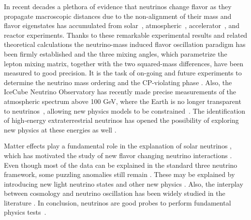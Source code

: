 \documentclass[3p,12pt]{elsarticle}
\begin{document}
In recent decades a plethora of evidence that neutrinos change
flavor as they propagate macroscopic distances due to the
non-alignment of their mass and flavor eigenstates has accumulated from
solar~\citep{Abe:2010hy, Borexino2014},
atmospheric~\citep{PhysRevD.91.072004,Richard:2015aua},
accelerator~\citep{PhysRevLett.112.181801,
  PhysRevD.93.051104,PhysRevLett.116.151806, PhysRevLett.110.251801}, and
reactor \citep{An:2013zwz,Abe:2015rcp, Kim:2016yvm} experiments.
Thanks to these remarkable
experimental results and related theoretical calculations the
  neutrino-mass induced flavor oscillation paradigm
\citep{Pontecorvo:1967fh,Gribov:1968kq,fukugita2003physics,
  Akhmedov:1999uz,Balantekin:2013kc, GonzalezGarcia:2007ib,Mohapatra:qv, Gouvea:2013fj}
has been firmly established and the three mixing angles, which
parametrize the lepton mixing matrix, together with the two
squared-mass differences, have been measured to good
precision\citep{Esteban:2016qun,deSalas:2017kay,Capozzi:2018ubv}. It
is the task of on-going 
and future experiments to determine the neutrino mass ordering 
and the CP-violating phase \citep{Hewett:2012et,
  Acciarri:2016crz,Aartsen:2014oha, Kouchner:2016pqa,DeRosa:2016ifc}. 
Also, the IceCube Neutrino Observatory has recently made precise measurements of the atmospheric
spectrum above 100 GeV, where the Earth is no longer transparent to
neutrinos~\citep{Donini:2018tsg}, allowing new physics
models to be constrained~\citep{Aartsen:2014gkd,TheIceCube:2016oqi}.
The identification of high-energy
extraterrestrial neutrinos \citep{ Aartsen:2014gkd, Aartsen:2015rwa}
has opened the possibility of exploring new physics at these energies as well
\citep{Arguelles:2015dca, Bustamante:2015waa, Baerwald:2012kc}. 

Matter effects play a fundamental role in the explanation of solar
neutrinos \citep{ Davis:1968cp,Bethe:1986ej}, which has motivated the study of new flavor
changing neutrino interactions \citep{Barger:1991ae, Roulet:1991sm, GonzalezGarcia:2011my,
  Gonzalez-Garcia:2013usa, Pospelov:2011dp, Kopp:2014nosterile,
  Maltoni:2015kca,Esteban:2018ppq}.
Even though most of the data can be explained in the standard three
neutrino framework, some puzzling anomalies still remain
\citep{LSND,Mention:2011rr,MiniBoone:2012dn,Aguilar-Arevalo:2018gpe,Alekseev:2016llm,
  Ko:2016owz, Ashenfelter:2018iov, Abreu:2018pxg,
  Dentler:2018sju}. These may be explained 
by introducing new light neutrino states \citep{kopp2013sterile,
  Collin:2016rao, Abazajian:2012rf,Blennow:2018hto} and other new physics
\citep{Bai:2015ztj,PalomaresRuiz:2005vf,Gninenko:2011xa}.
Also, the interplay between cosmology and neutrino
oscillation has been widely studied in the literature
\citep{Bergstrom:2014fqa, Giusarma:2016phn,
  Dasgupta:2013la,Hernandez:2016kel,Arguelles:2016uwb,Song:2018zyl,Chu:2018gxk}. 
In conclusion, neutrinos are good probes to perform 
fundamental physics tests~\citep{Hewett:2012et,Aartsen:2017ibm,Mewes:2018cze,Barenboim:2017vlc}.
\end{document}
